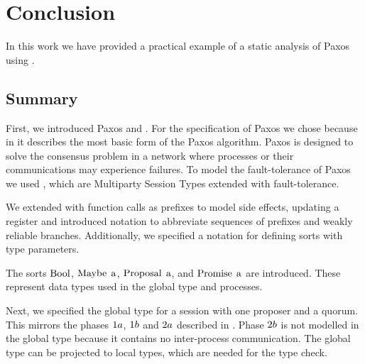 \chapter{Conclusion}
In this work we have provided a practical example of a static analysis of Paxos using \FTMPST.

\section{Summary}
First, we introduced Paxos and \FTMPST.
For the specification of Paxos we chose \cite{Lamport01} because in it \citeauthor{Lamport01} describes the most basic form of the Paxos algorithm.
Paxos is designed to solve the consensus problem in a network where processes or their communications may experience failures.
To model the fault-tolerance of Paxos we used \FTMPST, which are Multiparty Session Types extended with fault-tolerance.

We extended \FTMPST with function calls as prefixes to model side effects, \eg updating a register and introduced notation to abbreviate sequences of prefixes and weakly reliable branches.
Additionally, we specified a notation for defining sorts with type parameters.

The sorts $\operatorname{Bool}$, $\operatorname{Maybe}\; \operatorname{a}$, $\operatorname{Proposal}\; \operatorname{a}$, and $\operatorname{Promise}\; \operatorname{a}$ are introduced.
These represent data types used in the global type and processes.

Next, we specified the global type for a session with one proposer and a quorum.
This mirrors the phases $1a$, $1b$ and $2a$ described in \cite{Lamport01}.
Phase $2b$ is not modelled in the global type because it contains no inter-process communication.
The global type can be projected to local types, which are needed for the type check.

